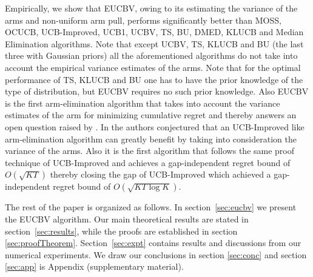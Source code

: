 Empirically, we show that EUCBV, owing to its estimating the variance of the arms and non-uniform arm pull,   performs significantly better than MOSS, OCUCB, UCB-Improved, UCB1, UCBV, TS, BU, DMED, KLUCB and Median Elimination algorithms. Note that except UCBV, TS, KLUCB and BU (the last three with Gaussian priors) all the aforementioned algorithms do not take into account the empirical variance estimates of the arms. Note that for the optimal performance of TS, KLUCB and BU one has to have the prior knowledge of the type of distribution,  but EUCBV requires no such prior knowledge. Also EUCBV is the first arm-elimination algorithm that takes into account the variance estimates of the arm for minimizing cumulative regret and thereby answers an open question raised by \citet{auer2010ucb}. In \citet{auer2010ucb} the authors conjectured that an UCB-Improved like arm-elimination algorithm can greatly benefit by taking into consideration the variance of the arms. Also it is the first algorithm that follows the same proof technique of UCB-Improved and achieves a gap-independent regret bound of $O\left( \sqrt{KT} \right)$ thereby closing the gap of UCB-Improved which achieved a gap-independent regret bound of $O\left( \sqrt{KT\log K} \right)$. 
	
	The rest of the paper is organized as follows. In section~\ref{sec:eucbv} we present the  EUCBV algorithm. Our main theoretical results are stated in section~\ref{sec:results}, while the proofs are established in   section \ref{sec:proofTheorem}. Section~\ref{sec:expt} contains results and discussions from our numerical experiments. We draw our conclusions in section \ref{sec:conc} and section \ref{sec:app} is Appendix (supplementary material).
	
	
	
	
	